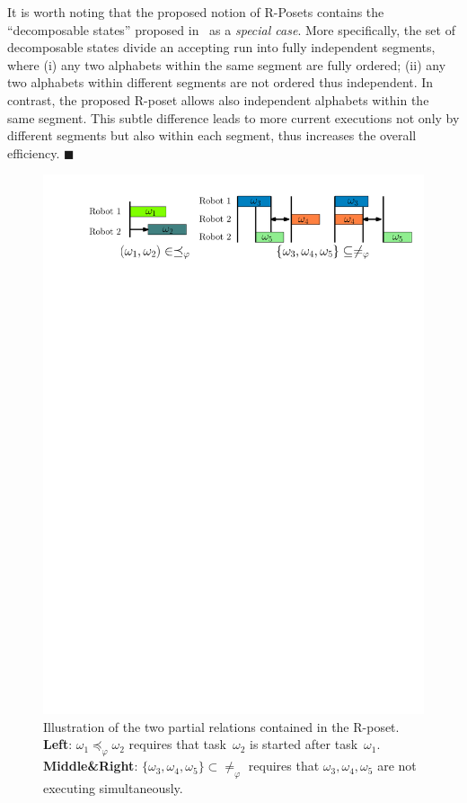 \begin{remark}\label{remark:compare-poset}
It is worth noting that the proposed notion of R-Posets contains
the ``decomposable states'' proposed in~\citep{schillinger2018simultaneous}
as a \emph{special case}.
More specifically, the set of decomposable states divide an accepting run into
fully independent segments, where
(i) any two alphabets within the same segment are fully ordered;
(ii) any two alphabets within different segments are not ordered thus independent.
In contrast, the proposed R-poset allows also independent alphabets within the
same segment.
This subtle difference leads to more current executions not only by
different segments but also within each segment,
thus increases the overall efficiency. \hfill $\blacksquare$
\end{remark}
\begin{figure}[t!]
\includegraphics[width=0.95\linewidth]{figures/poset_graph2.pdf}
\centering
\caption{Illustration of the two partial relations
        contained in the R-poset.
        \textbf{Left}: $\omega_1\preceq_{\varphi} \omega_2$ requires that
task~$\omega_2$ is started after task~$\omega_1$.
\textbf{Middle\&Right}:
$\{\omega_3,\omega_4,\omega_5\}\subset\neq_{\varphi}$
requires that $\omega_3,\omega_4,\omega_5$ are not executing simultaneously.}
\label{fig:partial}
\end{figure}

